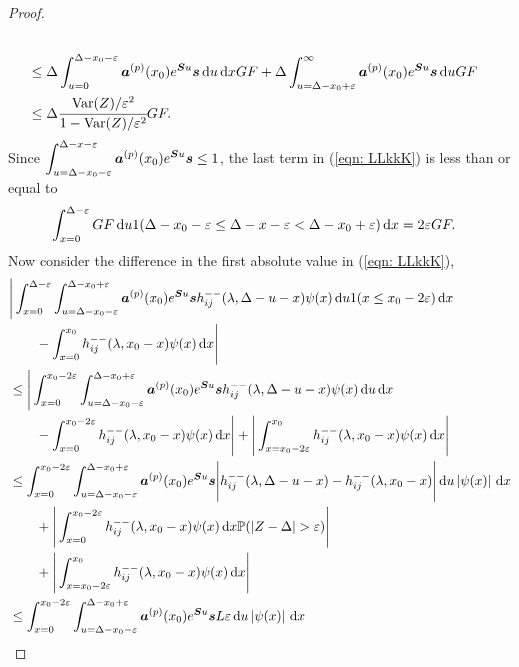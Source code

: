 \begin{proof}
\begin{align}
		\\&\leq\Delta\int_{u=0}^{\Delta-x_0-\varepsilon} \boldsymbol a^{(p)}(x_0)e^{\boldsymbol Su}\boldsymbol s  \, \mathrm{d} u \, \mathrm{d} xGF 
		+ \Delta \int_{u=\Delta-x_0+\varepsilon}^{\infty} \boldsymbol a^{(p)}(x_0)e^{\boldsymbol Su}\boldsymbol s  \, \mathrm{d} u GF \nonumber
		\\&\leq \Delta \cfrac{\mathrm{Var}(Z)/\varepsilon^2}{1-\mathrm{Var}(Z)/\varepsilon^2}GF. \label{eqn:aaAAAAd}
	\end{align}
	Since \(\displaystyle \int_{u=\Delta-x_0-\varepsilon}^{\Delta-x-\varepsilon} \boldsymbol a^{(p)}(x_0)e^{\boldsymbol Su}\boldsymbol s \leq 1\), the last term in (\ref{eqn: LLkkK}) is less than or equal to 
	\begin{align}
		&\int_{x=0}^{\Delta-\varepsilon}GF \, \mathrm{d} u 
		 1(\Delta-x_0-\varepsilon\leq \Delta - x -\varepsilon < \Delta-x_0+\varepsilon)\, \mathrm{d} x =2\varepsilon GF. \label{eqn:Qwe}
	\end{align}
	Now consider the difference in the first absolute value in (\ref{eqn: LLkkK}),
	\begin{align}
		&\Bigg|\int_{x=0}^{\Delta-\varepsilon}\int_{u=\Delta-x_0-\varepsilon}^{\Delta-x_0+\varepsilon} \bs a^{(p)}(x_0)e^{\bs Su}\bs s h_{ij}^{--}(\lambda, \Delta - u - x) \psi(x) \wrt u 1(x\leq x_0-2\varepsilon) \wrt x \nonumber
		\\&{}\qquad {} - \int_{x=0}^{x_0} h_{ij}^{--}(\lambda, x_0 - x)\psi(x)\wrt x \Bigg|\nonumber
		\\&\leq \Bigg|\int_{x=0}^{ x_0-2\varepsilon }\int_{u=\Delta-x_0-\varepsilon}^{\Delta-x_0+\varepsilon} \bs a^{(p)}(x_0)e^{\bs Su}\bs s h_{ij}^{--}(\lambda, \Delta - u - x) \psi(x) \wrt u  \wrt x \nonumber
		\\&{}\qquad {} - \int_{x=0}^{x_0-2\varepsilon} h_{ij}^{--}(\lambda, x_0 - x)\psi(x)\wrt x\Bigg| + \Bigg| \int_{x=x_0-2\varepsilon}^{x_0} h_{ij}^{--}(\lambda, x_0 - x)\psi(x)\wrt x\Bigg| \nonumber
		\\&\leq  \int_{x=0}^{ x_0-2\varepsilon }\int_{u=\Delta-x_0-\varepsilon}^{\Delta-x_0+\varepsilon} \bs a^{(p)}(x_0)e^{\bs Su}\bs s \Bigg| h_{ij}^{--}(\lambda, \Delta - u - x) - h_{ij}^{--}(\lambda, x_0 - x) \Bigg| \wrt u \left|\psi(x)\right| \wrt x  \nonumber
		\\&{}\qquad {} + \Bigg| \int_{x=0}^{x_0-2\varepsilon} h_{ij}^{--}(\lambda, x_0 - x)\psi(x) \wrt x \mathbb P(|Z-\Delta|>\varepsilon)\Bigg| \nonumber 
		\\&\qquad{} + \Bigg|\int_{x=x_0-2\varepsilon}^{x_0} h_{ij}^{--}(\lambda, x_0 - x)\psi(x)\wrt x \Bigg| \nonumber
		\\&\leq \int_{x=0}^{ x_0-2\varepsilon }\int_{u=\Delta-x_0-\varepsilon}^{\Delta-x_0+\varepsilon} \bs a^{(p)}(x_0)e^{\bs Su}\bs s L\varepsilon  \wrt u \left|\psi(x)\right| \wrt x \nonumber

\end{align}
\end{proof}
